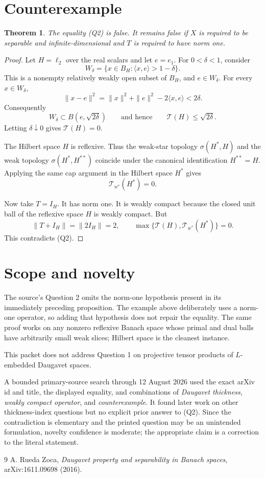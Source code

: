 \documentclass[11pt]{article}
\newtheorem{theorem}{Theorem}
\theoremstyle{remark}
\newcommand{\Tidx}{\mathcal T}
\begin{document}
\section{Counterexample}

\begin{theorem}
The equality \emph{(Q2)} is false. It remains false if \(X\) is required to
be separable and infinite-dimensional and \(T\) is required to have norm one.
\end{theorem}

\begin{proof}
Let \(H=\ell_2\) over the real scalars and let \(e=e_1\). For
\(0<\delta<1\), consider
\[
 W_\delta=\{x\in B_H:\langle x,e\rangle>1-\delta\}.
\]
This is a nonempty relatively weakly open subset of \(B_H\), and
\(e\in W_\delta\). For every \(x\in W_\delta\),
\[
 \|x-e\|^2
 =\|x\|^2+\|e\|^2-2\langle x,e\rangle
 <2\delta.
\]
Consequently
\[
 W_\delta\subset B(e,\sqrt{2\delta})
 \qquad\text{and hence}\qquad
 \Tidx(H)\le\sqrt{2\delta}.
\]
Letting \(\delta\downarrow0\) gives \(\Tidx(H)=0\).

The Hilbert space \(H\) is reflexive. Thus the weak-star topology
\(\sigma(H^*,H)\) and the weak topology \(\sigma(H^*,H^{**})\) coincide
under the canonical identification \(H^{**}=H\). Applying the same cap
argument in the Hilbert space \(H^*\) gives
\[
 \Tidx_{w^*}(H^*)=0.
\]

Now take \(T=I_H\). It has norm one. It is weakly compact because the closed
unit ball of the reflexive space \(H\) is weakly compact. But
\[
 \|T+I_H\|=\|2I_H\|=2,
 \qquad
 \max\{\Tidx(H),\Tidx_{w^*}(H^*)\}=0.
\]
This contradicts (Q2).
\end{proof}

\section{Scope and novelty}

The source's Question 2 omits the norm-one hypothesis present in its
immediately preceding proposition. The example above deliberately uses a
norm-one operator, so adding that hypothesis does not repair the equality.
The same proof works on any nonzero reflexive Banach space whose primal and
dual balls have arbitrarily small weak slices; Hilbert space is the cleanest
instance.

This packet does not address Question 1 on projective tensor products of
\(L\)-embedded Daugavet spaces.

A bounded primary-source search through 12 August 2026 used the exact arXiv
id and title, the displayed equality, and combinations of \emph{Daugavet
thickness}, \emph{weakly compact operator}, and \emph{counterexample}. It
found later work on other thickness-index questions but no explicit prior
answer to (Q2). Since the contradiction is elementary and the printed
question may be an unintended formulation, novelty confidence is moderate;
the appropriate claim is a correction to the literal statement.

\begin{thebibliography}{9}
A. Rueda Zoca,
\emph{Daugavet property and separability in Banach spaces},
arXiv:1611.09698 (2016).
\end{thebibliography}
\end{document}
